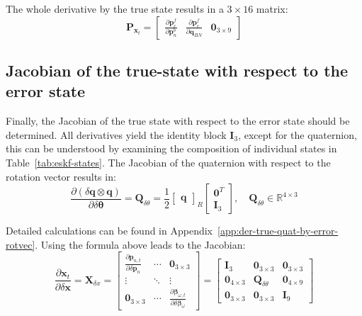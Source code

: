 The whole derivative by the true state results in a $3\times 16$ matrix:
\begin{equation}
    \mathbf{P}_{\mathbf{x}_t}=\begin{bmatrix}
     \frac{\partial\mathbf{p}_c^f}{\partial\mathbf{p}_n^b} & \frac{\partial\mathbf{p}_c^f}{\partial\mathbf{q}_{BN}} & \mathbf{0}_{3\times 9}
    \end{bmatrix}
    \label{eq:der-pc-by-xt}
\end{equation}

\subsection*{Jacobian of the true-state with respect to the error state}

Finally, the Jacobian of the true state with respect to the error state should be determined. All derivatives yield the identity block $\mathbf{I}_3$, except for the quaternion, this can be understood by examining the composition of individual states in Table~\ref{tab:eskf-states}. The Jacobian of the quaternion with respect to the rotation vector results in:
\begin{equation}
    \frac{\partial(\delta\mathbf{q}\otimes \mathbf{q})}{\partial\delta\boldsymbol{\theta}} = \mathbf{Q}_{\delta\theta} = \frac{1}{2}\begin{bmatrix}
        \mathbf{q}
    \end{bmatrix}_R
    \begin{bmatrix}
        \mathbf{0}^T \\
        \mathbf{I}_3
    \end{bmatrix}, \quad \mathbf{Q}_{\delta\theta}\in\mathbb{R}^{4\times 3}
\end{equation}

Detailed calculations can be found in Appendix~\ref{app:der-true-quat-by-error-rotvec}. Using the formula above leads to the Jacobian:
\begin{equation}
    \frac{\partial\mathbf{x}_t}{\partial\delta\mathbf{x}} = \mathbf{X}_{\delta x}=\begin{bmatrix}
        \frac{\partial\mathbf{p}_{n,t}}{\partial\delta\mathbf{p}_n} & \cdots & \mathbf{0}_{3\times 3} \\ \vdots & \ddots & \vdots \\
        \mathbf{0}_{3\times 3} & \cdots & \frac{\partial\boldsymbol{\beta}_{\omega, t}}{\partial\delta\boldsymbol{\beta}_{\omega}}
    \end{bmatrix} = \begin{bmatrix}
        \mathbf{I}_3 & \mathbf{0}_{3\times 3} & \mathbf{0}_{3\times 3} \\
        \mathbf{0}_{4\times 3} & \mathbf{Q}_{\delta\theta} & \mathbf{0}_{4\times 9} \\
        \mathbf{0}_{3\times 3} & \mathbf{0}_{3\times 3} & \mathbf{I}_{9}
    \end{bmatrix}
\end{equation}


